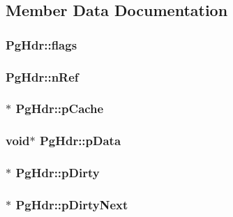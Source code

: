 \subsection{Member Data Documentation}
\hypertarget{struct_pg_hdr_a8ef58380f7e04f1e3c76fa208e227f95}{
\subsubsection[{flags}]{ Pg\-Hdr\-::flags}}\label{struct_pg_hdr_a8ef58380f7e04f1e3c76fa208e227f95}
\hypertarget{struct_pg_hdr_ac68c685d117788c18849e8853dd419d5}{
\subsubsection[{n\-Ref}]{ Pg\-Hdr\-::n\-Ref}}\label{struct_pg_hdr_ac68c685d117788c18849e8853dd419d5}
\hypertarget{struct_pg_hdr_a557aeaddd1b0805815ce06f1bfd27782}{
\subsubsection[{p\-Cache}]{$\ast$ Pg\-Hdr\-::p\-Cache}}\label{struct_pg_hdr_a557aeaddd1b0805815ce06f1bfd27782}
\hypertarget{struct_pg_hdr_a0f9f2ac8492c0cdad5898036db20b798}{
\subsubsection[{p\-Data}]{\setlength{\rightskip}{0pt plus 5cm}void$\ast$ Pg\-Hdr\-::p\-Data}}\label{struct_pg_hdr_a0f9f2ac8492c0cdad5898036db20b798}
\hypertarget{struct_pg_hdr_a7732b1c0f19d9555ac93d4879fc95bbd}{
\subsubsection[{p\-Dirty}]{$\ast$ Pg\-Hdr\-::p\-Dirty}}\label{struct_pg_hdr_a7732b1c0f19d9555ac93d4879fc95bbd}
\hypertarget{struct_pg_hdr_a61b56eb694ce445799963f7eb912e367}{
\subsubsection[{p\-Dirty\-Next}]{$\ast$ Pg\-Hdr\-::p\-Dirty\-Next}}\label{struct_pg_hdr_a61b56eb694ce445799963f7eb912e367}
